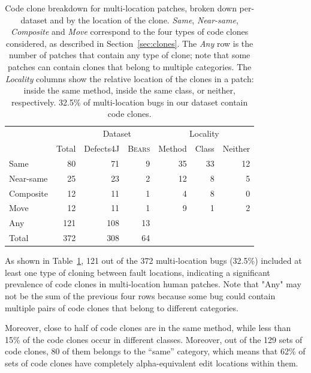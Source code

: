 \documentclass[10pt, conference]{IEEEtran}
\newcommand\bears{\textsc{Bears}\xspace}
\begin{document}
\begin{table}
{\begin{center}
\begin{tabular} {lrrrrrr}
\toprule
&&\multicolumn{2}{c}{Dataset} &\multicolumn{3}{c}{Locality}\\
& Total & Defects4J & \bears & Method & Class & Neither\\
\midrule
Same      &  80 &  71 & 9 & 35 & 33 & 12 \\
Near-same   &  25 &  23 & 2 & 12 &  8 &  5 \\
Composite &  12 &  11 & 1 &  4 &  8 &  0 \\
Move      &  12 &  11 & 1 &  9 &  1 &  2 \\
\midrule
Any       & 121 & 108 & 13\\
Total     & 372 & 308 & 64\\
\bottomrule
\end{tabular}
\end{center}
}
\caption{Code clone breakdown for multi-location patches, broken down
  per-dataset and by the location of the clone. \emph{Same}, \emph{Near-same},
  \emph{Composite} and \emph{Move} correspond to the four types of code clones
  considered, as described in Section~\ref{sec:clones}.  The \emph{Any} row is the
  number of patches that contain any type of clone; note that some patches can
  contain clones that belong to multiple categories. The \emph{Locality} columns
  show the relative location of the clones in a patch: inside the same method,
  inside the same class, or neither, respectively. 32.5\% of multi-location bugs
  in our dataset contain code clones.}
\label{tab:clones}
\end{table}

As shown in Table~\ref{tab:clones}, 121 out of the 372 multi-location bugs
(32.5\%) included at least one type of cloning between fault locations,
indicating a significant prevalence of code clones in multi-location human
patches.  Note that "Any" may not be the sum of the previous four rows because
some bug could contain multiple pairs of code clones that belong to different
categories.

Moreover, close to half of code clones are in the same method, while less than
15\% of the code clones occur in different classes. Moreover, out of the 129 sets of code clones,
80 of them belongs to the ``same'' category, which means that 62\% of sets of code clones have completely
alpha-equivalent edit locations within them.
\end{document}
